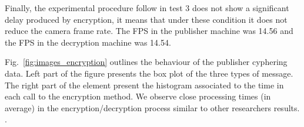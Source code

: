 \documentclass[journal,twoside]{JoPhA}
\begin{document}
Finally, the experimental procedure follow in test 3 does not show a significant delay produced by encryption, it means that under these condition it does not reduce the camera frame rate. The FPS in the publisher machine was 14.56 and the FPS in the decryption machine was 14.54.



Fig.~\ref{fig:images_encryption} outlines the behaviour of the publisher cyphering data. Left part of the figure presents the box plot of the three types of message. The right part of the element present the histogram associated to the time in each call to the encryption method. We observe close processing times (in average) in the encryption/decryption process similar to other researchers results\cite{elminaam2008performance}. {\color{red}{deberíamos decir algo bonito aqui}.}


%
%






% 
% 
% 
% 
\end{document}
